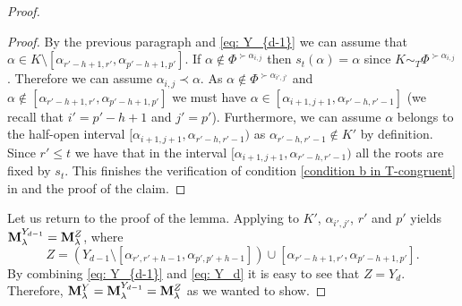 \begin{proof}
\begin{proof}
\smallskip
By the previous paragraph and  \eqref{eq: Y_{d-1}} we can assume that $\alpha \in K\setminus [\alpha_{r'-h+1,r'},\alpha_{p'-h+1,p'}] $. If $\alpha \notin \Phi^{\succ \alpha_{i,j}}$ then $s_{t}(\alpha) =\alpha$ since $K\sim_T \Phi^{\succ \alpha_{i,j}}$. Therefore we can assume $ \alpha_{i,j} \prec \alpha$. As $\alpha\notin  \Phi^{\succ \alpha_{i',j'}}$ and $\alpha \notin [\alpha_{r'-h+1,r'},\alpha_{p'-h+1,p'}]$ we must have $\alpha \in [\alpha_{i+1,j+1}, \alpha_{r'-h,r'-1}]$ (we recall that $i'=p'-h+1$ and $j'=p'$). Furthermore, we can assume $\alpha$ belongs to the half-open interval $[\alpha_{i+1,j+1}, \alpha_{r'-h,r'-1})$ as $\alpha_{r'-h,r'-1}\notin K'$ by definition. Since $r' \leq t$ we have that in the interval  $[\alpha_{i+1,j+1}, \alpha_{r'-h,r'-1})$ all the roots are fixed by $s_t$. This finishes the verification of condition \ref{condition b in T-congruent} in  and the proof of the claim. 
\end{proof}

Let us return to the proof of the lemma. Applying  to $K'$, $\alpha_{i',j'}$, $r'$ and $p'$ yields $\mathbf{M}_{\lambda}^{Y_{d-1}} = \mathbf{M}_{\lambda}^{Z}$, where
\begin{equation}\label{eq: Y_d}
    Z= ( Y_{d-1}  \setminus [  \alpha_{r',r'+h-1},\alpha_{p',p'+h-1}  ] ) \cup [ \alpha_{r'-h+1,r'}, \alpha_{p'-h+1,p'} ].
\end{equation}
By combining \eqref{eq: Y_{d-1}} and \eqref{eq: Y_d} it is easy to see that $Z=Y_d$. Therefore, $ \mathbf{M}_{\lambda}^{Y} = \mathbf{M}_{\lambda}^{Y_{d-1}} = \mathbf{M}_{\lambda}^Z  $ as we wanted to show. 
\end{proof}


